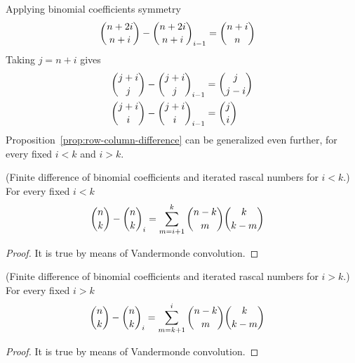Applying binomial coefficients symmetry
\begin{align*}
    \binom{n+2i}{n+i} - \binom{n+2i}{n+i}_{i-1} &= \binom{n+i}{n}
\end{align*}
Taking $j=n+i$ gives
\begin{align*}
    \binom{j+i}{j} - \binom{j+i}{j}_{i-1} &= \binom{j}{j-i} \\
    \binom{j+i}{i} - \binom{j+i}{i}_{i-1} &= \binom{j}{i}
\end{align*}
Proposition~\eqref{prop:row-column-difference} can be generalized even further, for every fixed $i<k$ and $i>k$.
\begin{proposition}
(Finite difference of binomial coefficients and iterated rascal numbers for $i<k$.)
    For every fixed $i<k$
    \label{prop:row-column-difference-general}
    \begin{align*}
        \binom{n}{k} - \binom{n}{k}_{i} &= \sum_{m=i+1}^{k} \binom{n-k}{m} \binom{k}{k-m}
    \end{align*}
    \begin{proof}
        It is true by means of Vandermonde convolution.
    \end{proof}
\end{proposition}
\begin{proposition}
(Finite difference of binomial coefficients and iterated rascal numbers for $i>k$.)
    For every fixed $i>k$
    \label{prop:row-column-difference-general-i-greater-k}
    \begin{align*}
        \binom{n}{k} - \binom{n}{k}_{i} &= \sum_{m=k+1}^{i} \binom{n-k}{m} \binom{k}{k-m}
    \end{align*}
    \begin{proof}
        It is true by means of Vandermonde convolution.
    \end{proof}
\end{proposition}

